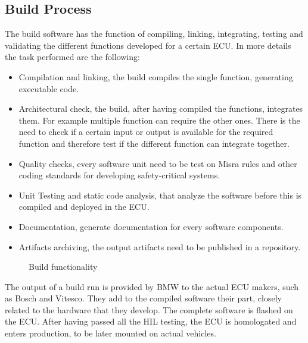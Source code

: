 \documentclass[../main.tex]{subfiles}
\begin{document}
\subsection{Build Process}
\label{subsection:Build process}
The build software has the function of compiling, linking, integrating, testing and validating the different functions developed for a certain \gls{ECU}. In more details the task performed are the following:
\begin{itemize}
    \item Compilation and linking, the build compiles the single function, generating executable code. 
    \item Architectural check, the build, after having compiled the functions, integrates them. For example multiple function can require the other ones. There is the need to check if a certain input or output is available for the required function and therefore test if the different function can integrate together.
    \item Quality checks, every software unit need to be test on Misra rules and other coding standards for developing safety-critical systems.
    \item Unit Testing and static code analysis, that analyze the software before this is compiled and deployed in the \gls{ECU}.
    \item Documentation, generate documentation for every software components. 
    \item Artifacts archiving, the output artifacts need to be published in a repository.
\end{itemize}
\begin{figure}[H]
    \centering
    \caption{Build functionality}
    \label{fig:buildfucntionality}
\end{figure}
The output of a build run is provided by \gls{BMW} to the actual \gls{ECU} makers, such as Bosch and Vitesco. They add to the compiled software their part, closely related to the hardware that they develop. The complete software is flashed on the \gls{ECU}. After having passed all the \gls{HIL} testing, the \gls{ECU} is homologated and enters production, to be later mounted on actual vehicles.
\end{document}
